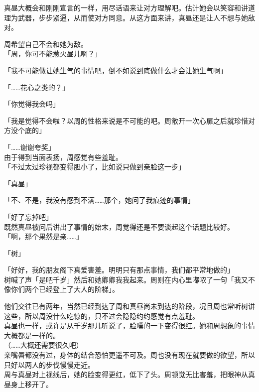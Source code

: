 真昼大概会和刚刚宣言的一样，用尽话语来让对方理解吧。估计她会以笑容和讲道理为武器，步步紧逼，从而使对方同意。从这方面来讲，真昼还是让人不想与她敌对。

周希望自己不会和她为敌。\\

「周，你可不能惹火昼儿啊？」

「我不可能做让她生气的事情吧，倒不如说到底做什么才会让她生气啊」

「……花心之类的？」

「你觉得我会吗」

「我是觉得不会啦？以周的性格来说是不可能的吧。周敞开一次心扉之后就珍惜对方没个底的」

「……谢谢夸奖」\\

由于得到当面表扬，周感觉有些羞耻。\\

「不过太过珍视都变得胆小了，比如说只做到亲脸这一步」

「真昼」

「不、不是，我没有感到不满……那个，她问了我痕迹的事情」

「好了忘掉吧」\\

既然真昼被问后讲出了事情的始末，周觉得还是不要谈起这个话题比较好。\\

「啊，那个果然是亲……」

「树」

「好好，我的朋友阁下真爱害羞。明明只有那点事情，我们都平常地做的」\\

树喊了声「是吧千岁」然后和她卿卿我我起来。周则在内心里嘟哝了一句「我又不像你们两个已经登上了大人的阶梯」。

他们交往已有两年，当然已经到达了周和真昼尚未到达的阶段，况且周也常听树讲这些，所以周没什么吃惊的，只不过会隐隐约约感觉有点羞耻。\\

真昼也一样，或许是从千岁那儿听说了，脸噗的一下变得很红。她和周想象的事情大概都是一样的。\\

（……大概还需要很久吧）\\

亲嘴唇都没有过，身体的结合恐怕更遥不可及。周也没有现在就要做的欲望，所以只好以两人的步伐慢慢走近。\\

周与真昼对上视线后，她的脸变得更红，低下了头。周顿觉无比害羞，把眼神从真昼身上移开了。
